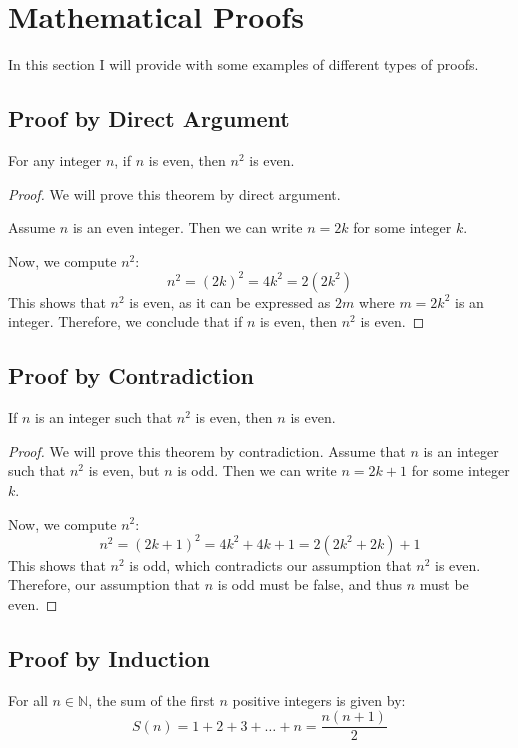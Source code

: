 \section{Mathematical Proofs}
In this section I will provide with some examples of different types of proofs.
\subsection{Proof by Direct Argument}

    For any integer \( n \), if \( n \) is even, then \( n^2 \) is even.
\begin{proof}
    We will prove this theorem by direct argument. 

    Assume \( n \) is an even integer. Then we can write \( n = 2k \) for some integer \( k \). 

    Now, we compute \( n^2 \):
    \[
    n^2 = (2k)^2 = 4k^2 = 2(2k^2)
    \]
    This shows that \( n^2 \) is even, as it can be expressed as \( 2m \) where \( m = 2k^2 \) is an integer.
    Therefore, we conclude that if \( n \) is even, then \( n^2 \) is even.
\end{proof}
\subsection{Proof by Contradiction}

    If \( n \) is an integer such that \( n^2 \) is even, then \( n \) is even.
   
\begin{proof}
    We will prove this theorem by contradiction. Assume that \( n \) is an integer such that \( n^2 \) is even, but \( n \) is odd. Then we can write \( n = 2k + 1 \) for some integer \( k \). 

    Now, we compute \( n^2 \):
    \[
    n^2 = (2k + 1)^2 = 4k^2 + 4k + 1 = 2(2k^2 + 2k) + 1
    \]
    This shows that \( n^2 \) is odd, which contradicts our assumption that \( n^2 \) is even. Therefore, our assumption that \( n \) is odd must be false, and thus \( n \) must be even.
\end{proof}
\subsection{Proof by Induction}

    For all \( n \in \mathbb{N} \), the sum of the first \( n \) positive integers is given by:
    \[
    S(n) = 1 + 2 + 3 + \ldots + n = \frac{n(n+1)}{2}
    \]

